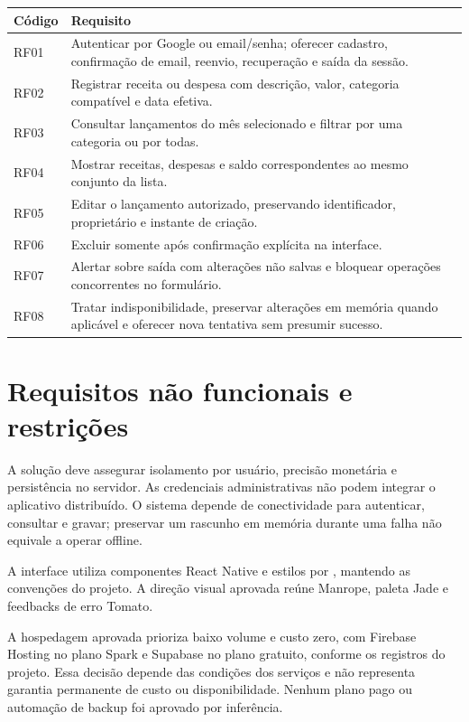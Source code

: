 \documentclass[
    12pt,
    oneside,
    a4paper,
    brazil
]{abntex2}
\newcommand{\codigo}[1]{\texttt{\detokenize{#1}}}
\begin{document}
\begin{longtable}{@{}p{}p{}@{}}
\toprule
\textbf{Código} & \textbf{Requisito} \\
\midrule
\endhead
RF01 & Autenticar por Google ou email/senha; oferecer cadastro, confirmação de email, reenvio, recuperação e saída da sessão. \\
RF02 & Registrar receita ou despesa com descrição, valor, categoria compatível e data efetiva. \\
RF03 & Consultar lançamentos do mês selecionado e filtrar por uma categoria ou por todas. \\
RF04 & Mostrar receitas, despesas e saldo correspondentes ao mesmo conjunto da lista. \\
RF05 & Editar o lançamento autorizado, preservando identificador, proprietário e instante de criação. \\
RF06 & Excluir somente após confirmação explícita na interface. \\
RF07 & Alertar sobre saída com alterações não salvas e bloquear operações concorrentes no formulário. \\
RF08 & Tratar indisponibilidade, preservar alterações em memória quando aplicável e oferecer nova tentativa sem presumir sucesso. \\
\bottomrule
\end{longtable}

\section{Requisitos não funcionais e restrições}

A solução deve assegurar isolamento por usuário, precisão monetária e persistência no servidor. As credenciais administrativas não podem integrar o aplicativo distribuído. O sistema depende de conectividade para autenticar, consultar e gravar; preservar um rascunho em memória durante uma falha não equivale a operar offline.

A interface utiliza componentes React Native e estilos por \codigo{StyleSheet}, mantendo as convenções do projeto. A direção visual aprovada reúne Manrope, paleta Jade e feedbacks de erro Tomato.

A hospedagem aprovada prioriza baixo volume e custo zero, com Firebase Hosting no plano Spark e Supabase no plano gratuito, conforme os registros do projeto. Essa decisão depende das condições dos serviços e não representa garantia permanente de custo ou disponibilidade. Nenhum plano pago ou automação de backup foi aprovado por inferência.
\end{document}
